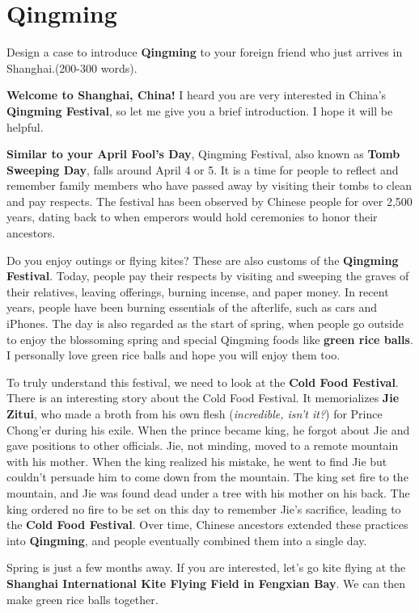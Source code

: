 \section{Qingming}

\begin{question}
    Design a case to introduce \textbf{Qingming} to your foreign friend who just arrives in Shanghai.(200-300 words).
\end{question}

\textbf{Welcome to Shanghai, China!} I heard you are very interested in China's \textbf{Qingming Festival}, so let me give you a brief introduction. I hope it will be helpful.

\textbf{Similar to your April Fool's Day}, Qingming Festival, also known as \textbf{Tomb Sweeping Day}, falls around April 4 or 5. It is a time for people to reflect and remember family members who have passed away by visiting their tombs to clean and pay respects. The festival has been observed by Chinese people for over 2,500 years, dating back to when emperors would hold ceremonies to honor their ancestors.

Do you enjoy outings or flying kites? These are also customs of the \textbf{Qingming Festival}. Today, people pay their respects by visiting and sweeping the graves of their relatives, leaving offerings, burning incense, and paper money. In recent years, people have been burning essentials of the afterlife, such as cars and iPhones. The day is also regarded as the start of spring, when people go outside to enjoy the blossoming spring and special Qingming foods like \textbf{green rice balls}. I personally love green rice balls and hope you will enjoy them too.

To truly understand this festival, we need to look at the \textbf{Cold Food Festival}. There is an interesting story about the Cold Food Festival. It memorializes \textbf{Jie Zitui}, who made a broth from his own flesh (\textit{incredible, isn't it?}) for Prince Chong'er during his exile. When the prince became king, he forgot about Jie and gave positions to other officials. Jie, not minding, moved to a remote mountain with his mother. When the king realized his mistake, he went to find Jie but couldn't persuade him to come down from the mountain. The king set fire to the mountain, and Jie was found dead under a tree with his mother on his back. The king ordered no fire to be set on this day to remember Jie's sacrifice, leading to the \textbf{Cold Food Festival}. Over time, Chinese ancestors extended these practices into \textbf{Qingming}, and people eventually combined them into a single day.

Spring is just a few months away. If you are interested, let's go kite flying at the \textbf{Shanghai International Kite Flying Field in Fengxian Bay}. We can then make green rice balls together.
